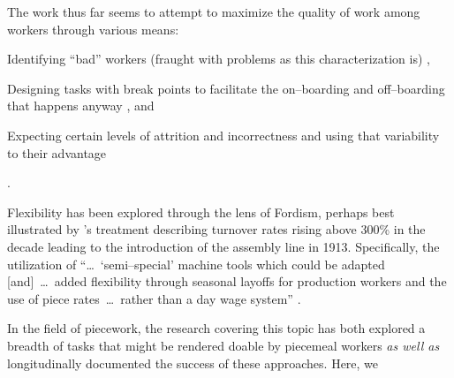 \documentclass[trackingWork]{subfiles}
\begin{document}
The work thus far seems to attempt to maximize the quality of work among workers through various means:
\begin{inlinelist}
  \item Identifying ``bad'' workers (fraught with problems as this characterization is) \cite{MaliciousCrowdworkersGadiraju},
  \item Designing tasks with break points to facilitate the on--boarding and off--boarding that happens anyway \cite{cheng2015break}, and
  \item Expecting certain levels of attrition and incorrectness and using that variability to their advantage \cite{embracingErrorKrishna}
\end{inlinelist}.




Flexibility has been explored through the lens of Fordism, perhaps best illustrated by
\citeauthor{tolliday1986between}'s treatment describing
turnover rates rising above 300\% in the decade leading to the introduction of the assembly line in 1913.
Specifically, the utilization of ``\dots~`semi--special' machine tools which could be adapted
[and]~\dots~added flexibility through seasonal layoffs for production workers and the use of
piece rates~\dots~rather than a day wage system''
\cite{tolliday1986between}.

In the field of piecework,
the research covering this topic has both explored
a breadth of tasks that might be rendered doable by piecemeal workers
\textit{as well as} longitudinally documented the success of these approaches.
Here, we 
\end{document}
